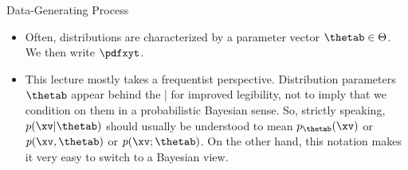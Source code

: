 \begin{vbframe}{Data-Generating Process}
\begin{itemize}
  \item Often, distributions are characterized by a parameter vector
  $\thetab \in \Theta$. We then write $\pdfxyt$.

  \item This lecture mostly takes a frequentist perspective. Distribution
  parameters $\thetab$ appear behind the | for improved legibility, not to imply
  that we condition on them in a probabilistic Bayesian sense.
  So, strictly speaking, $p(\xv | \thetab)$ should usually be understood to mean
  $p_{\thetab}(\xv)$ or $p(\xv, \thetab)$ or $p(\xv; \thetab)$.
  On the other hand, this notation makes it very easy to switch to a Bayesian view.

\end{itemize}

\end{vbframe}


\endlecture


